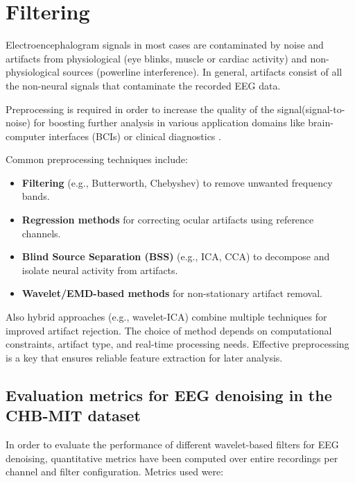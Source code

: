 \documentclass{article}
\begin{document}
		\section{Filtering}

			Electroencephalogram signals in most cases are contaminated by noise 
			and artifacts from physiological (eye blinks, muscle or cardiac activity) 
			and non-physiological sources (powerline interference). 
			In general, artifacts consist of all the non-neural signals 
			that contaminate the recorded EEG data. 
			
			Preprocessing is required in order to increase 
			the quality of the signal(signal-to-noise)
			for boosting further analysis in various application 
			domains like brain-computer interfaces (BCIs) 
			or clinical diagnostics 
			\cite{dhanaseivam2023}\cite{jiang2019}\cite{sen2023}\cite{removeArtifactsReview}.
			
			Common preprocessing techniques include:  
			\begin{itemize}  
			    \item \textbf{Filtering} (e.g., Butterworth, Chebyshev) to remove unwanted frequency bands.  
			    \item \textbf{Regression methods} for correcting ocular artifacts using reference channels.  
			    \item \textbf{Blind Source Separation (BSS)} (e.g., ICA, CCA) to decompose and isolate neural activity from artifacts.  
			    \item \textbf{Wavelet/EMD-based methods} for non-stationary artifact removal.  
			\end{itemize}  
			
			Also hybrid approaches (e.g., wavelet-ICA) combine multiple techniques for improved artifact rejection. 
			The choice of method depends on computational constraints, artifact type, 
			and real-time processing needs. 
			Effective preprocessing is a key that ensures reliable feature extraction for later analysis.  

						

			\subsection{Evaluation metrics for EEG denoising in the CHB-MIT dataset}

			In order to evaluate the performance of 
			different wavelet-based filters for EEG denoising, 
			quantitative metrics have been computed over entire recordings 
			per channel and filter configuration. 
			Metrics used were:
\end{document}
